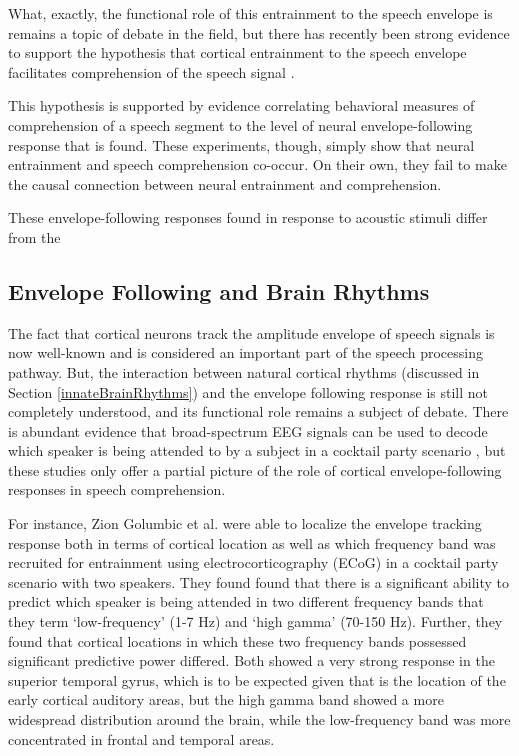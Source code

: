 \documentclass[titlepage]{article}
\begin{document}
    What, exactly, the functional role of this entrainment to the speech
    envelope is remains a topic of debate in the field, but there has recently
    been strong evidence to support the hypothesis that cortical entrainment to
    the speech envelope facilitates comprehension of the speech signal
    \cite{Ding2014a,Ding2012,OSullivan2015}.


    This hypothesis is supported by evidence correlating behavioral measures of
    comprehension of a speech segment to the level of neural envelope-following
    response that is found. These experiments, though, simply show that neural
    entrainment and speech comprehension co-occur. On their own, they fail to
    make the causal connection between neural entrainment and comprehension.

    These envelope-following responses found in response to acoustic stimuli
    differ from the

  \subsection{Envelope Following and Brain Rhythms}

    The fact that cortical neurons track the amplitude envelope of speech
    signals is now well-known and is considered an important part of the speech
    processing pathway. But, the interaction between natural cortical rhythms
    (discussed in Section \ref{innateBrainRhythms}) and the envelope following
    response is still not completely understood, and its functional role remains
     a subject of debate. There is abundant evidence that broad-spectrum EEG
     signals can be used to decode which speaker is being attended to by a
     subject in a cocktail party scenario \cite{Horton2014,DeTaillez2018}, but
     these studies only offer a partial picture of the role of cortical
     envelope-following responses in speech comprehension.

    For instance, Zion Golumbic et al. \cite{ZionGolumbic2013} were able to
    localize the envelope tracking response both in terms of cortical location
    as well as which frequency band was recruited for entrainment using
    electrocorticography (ECoG) in a cocktail party scenario with two speakers.
    They found found that there is a significant ability to predict which
    speaker is being attended in two different frequency bands that they term
    `low-frequency' (1-7 Hz) and `high gamma' (70-150 Hz). Further, they found
    that cortical locations in which these two frequency bands possessed
    significant predictive power differed. Both showed a very strong response
    in the superior temporal gyrus, which is to be expected given that is the
    location of the early cortical auditory areas, but the high gamma band
    showed a more widespread distribution around the brain, while the
    low-frequency band was more concentrated in frontal and temporal areas.
\end{document}
